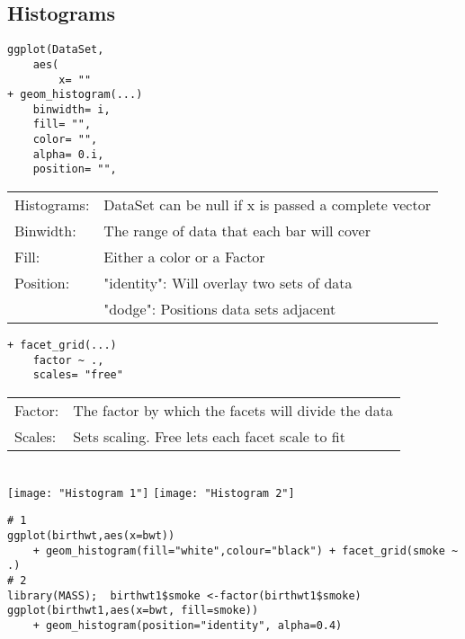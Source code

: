 \documentclass[]{article}
\begin{document}
\subsection{Histograms}
\begin{verbatim}
ggplot(DataSet,
	aes(
		x= ""
+ geom_histogram(...)
	binwidth= i,
	fill= "",
	color= "",
	alpha= 0.i,
	position= "",
\end{verbatim}
\begin{tabular}{l l}
	Histograms: & DataSet can be null if x is passed a complete vector \\
	Binwidth: & The range of data that each bar will cover \\
	Fill: & Either a color or a Factor \\
	Position: & "identity": Will overlay two sets of data \\
		& "dodge": Positions data sets adjacent \\
\end{tabular}
\begin{verbatim}
+ facet_grid(...)
	factor ~ .,
	scales= "free"
\end{verbatim}
\begin{tabular}{l l}
	Factor: & The factor by which the facets will divide the data \\
	Scales: & Sets scaling. Free lets each facet scale to fit \\
\end{tabular} \\

\texttt{[image: "Histogram 1"]} 
\texttt{[image: "Histogram 2"]} \\
\begin{verbatim}
# 1 
ggplot(birthwt,aes(x=bwt)) 
	+ geom_histogram(fill="white",colour="black") + facet_grid(smoke ~ .)
# 2 
library(MASS);  birthwt1$smoke <-factor(birthwt1$smoke)
ggplot(birthwt1,aes(x=bwt, fill=smoke)) 
	+ geom_histogram(position="identity", alpha=0.4)
\end{verbatim}
\end{document}
